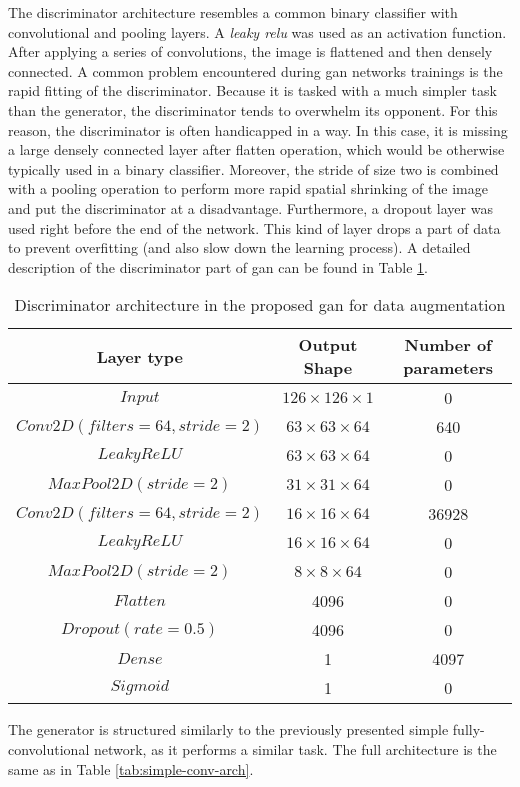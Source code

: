 The discriminator architecture resembles a common binary classifier with convolutional and pooling layers.
A \textit{leaky \gls{relu}} was used as an activation function.
After applying a series of convolutions, the image is flattened and then densely connected.
A common problem encountered during \gls{gan} networks trainings is the rapid fitting of the discriminator.
Because it is tasked with a much simpler task than the generator, the discriminator tends to overwhelm its opponent.
For this reason, the discriminator is often handicapped in a way.
In this case, it is missing a large densely connected layer after flatten operation, which would be otherwise typically used in a binary classifier.
Moreover, the stride of size two is combined with a pooling operation to perform more rapid spatial shrinking of the image and put the discriminator at a disadvantage.
Furthermore, a dropout layer was used right before the end of the network.
This kind of layer drops a part of data to prevent overfitting (and also slow down the learning process).
A detailed description of the discriminator part of \gls{gan} can be found in Table \ref{tab:discriminator-arch}.
\begin{table}
    \centering
    \caption{Discriminator architecture in the proposed \gls{gan} for data augmentation}
    \label{tab:discriminator-arch}
    \begin{tabular}{ccc}
        \toprule
        Layer type & Output Shape & Number of parameters \\
        \midrule
        $ Input $      & $ 126 \times 126 \times 1 $ & 0                    \\
        $ Conv2D(filters=64, stride=2) $ & $ 63 \times 63 \times 64 $ & 640 \\
        $ LeakyReLU $ & $ 63 \times 63 \times 64 $ & 0 \\
        $ MaxPool2D(stride=2) $ & $ 31 \times 31 \times 64 $ & 0 \\
        $ Conv2D(filters=64, stride=2) $ & $ 16 \times 16 \times 64 $ & 36928 \\
        $ LeakyReLU $ & $ 16 \times 16 \times 64 $ & 0 \\
        $ MaxPool2D(stride=2) $ & $ 8 \times 8 \times 64 $ & 0 \\
        $ Flatten $ & 4096 & 0 \\
        $ Dropout(rate=0.5) $ & 4096 & 0 \\
        $ Dense $ & 1 & 4097 \\
        $ Sigmoid $ & 1 & 0 \\
        \bottomrule
    \end{tabular}
\end{table}
The generator is structured similarly to the previously presented simple fully-convolutional network, as it performs a similar task.
The full architecture is the same as in Table \ref{tab:simple-conv-arch}.

